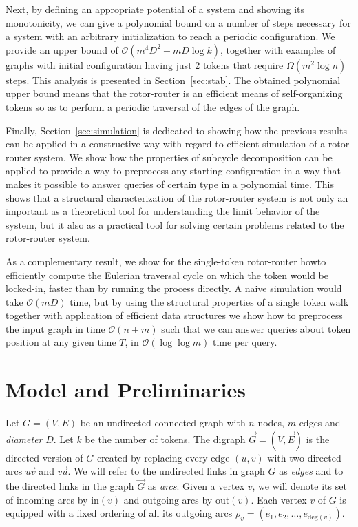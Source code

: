 \documentclass{article}[11pt,letter]
\newcommand{\bigo}{\mathcal{O}}
\newcommand{\inedg}{\mathrm{in}}
\newcommand{\outedg}{\mathrm{out}}
\begin{document}
Next, by defining an appropriate potential of a system and showing its monotonicity, we can give a polynomial bound on a number of steps necessary for a system with an arbitrary initialization to reach a periodic configuration. We provide an upper bound of $\bigo(m^4D^2 + mD\log k)$, together with examples of graphs with initial configuration having just 2 tokens that require $\Omega(m^2 \log n)$ steps. This analysis is presented in Section~\ref{sec:stab}. The obtained polynomial upper bound means that the rotor-router is an efficient means of self-organizing tokens so as to perform a periodic traversal of the edges of the graph.

Finally, Section~\ref{sec:simulation} is dedicated to showing how the previous results can be applied in a constructive way with regard to efficient simulation of a rotor-router system.  We show how the properties of subcycle decomposition can be applied to provide a way to preprocess any starting configuration in a way that makes it possible to answer queries of certain type in a polynomial time. This shows that a structural characterization of the rotor-router system is not only an important as a theoretical tool for understanding the limit behavior of the system, but it also as a practical tool for solving certain problems related to the rotor-router system.

As a complementary result, we show for the single-token rotor-router howto efficiently compute the Eulerian traversal cycle on which the token would be locked-in, faster than by running the process directly. A naive simulation would take $\bigo(mD)$ time, but by using the structural properties of a single token walk together with application of efficient data structures we show how to preprocess the input graph in time $\bigo(n+m)$ such that we can answer queries about token position at any given time $T$, in $\bigo(\log \log m)$ time per query.



\vspace{-0.2cm}

\section{Model and Preliminaries}

Let $G=(V,E)$ be an undirected connected graph with $n$ nodes, $m$ edges and \emph{diameter} $D$. Let $k$ be the number of tokens. The digraph $\vec{G} = (V,\vec{E})$ is the directed version of $G$ created by replacing every edge $(u,v)$ with two directed arcs $\vec{uv}$ and $\vec{vu}$. We will refer to the undirected links in graph $G$ as \emph{edges} and to the directed links in the graph $\vec{G}$ as \emph{arcs}. Given a vertex $v$, we will denote its set of incoming arcs by $\inedg(v)$ and outgoing arcs by $\outedg(v)$.
Each vertex $v$ of $G$ is equipped with a fixed ordering of all its outgoing arcs $\rho_v = (e_1,e_2, \ldots, e_{\text{deg}(v)})$.
\end{document}
